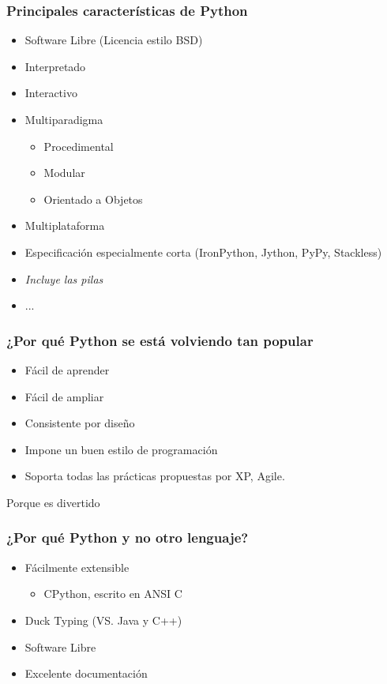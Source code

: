 \documentclass{beamer}
\begin{document}
\begin{frame}
 \frametitle{Principales características de Python}

\begin{itemize}
 \item Software Libre (Licencia estilo BSD)
 \item Interpretado
 \item Interactivo
 \item Multiparadigma
 \begin{itemize}
  \item Procedimental
  \item Modular
  \item Orientado a Objetos
 \end{itemize}
 \item Multiplataforma
 \item Especificación especialmente corta (IronPython, Jython, PyPy, Stackless)
 \item \emph{Incluye las pilas}
 \item ...
\end{itemize}

\end{frame}

\begin{frame}
 \frametitle{¿Por qué Python se está volviendo tan popular}
\begin{itemize}
 \item Fácil de aprender
 \item Fácil de ampliar
 \item Consistente por diseño
 \item Impone un buen estilo de programación
 \item Soporta todas las prácticas propuestas por XP, Agile.
\end{itemize}
\begin{center}
 Porque es divertido
\end{center}

\end{frame}

\begin{frame}
 \frametitle{¿Por qué Python y no otro lenguaje?}
\begin{itemize}
 \item Fácilmente extensible
 \begin{itemize}
 \item CPython, escrito en ANSI C
\end{itemize}
 \item Duck Typing (VS. Java y C++)
 \item Software Libre
 \item Excelente documentación
\end{itemize}

\end{frame}
\end{document}
